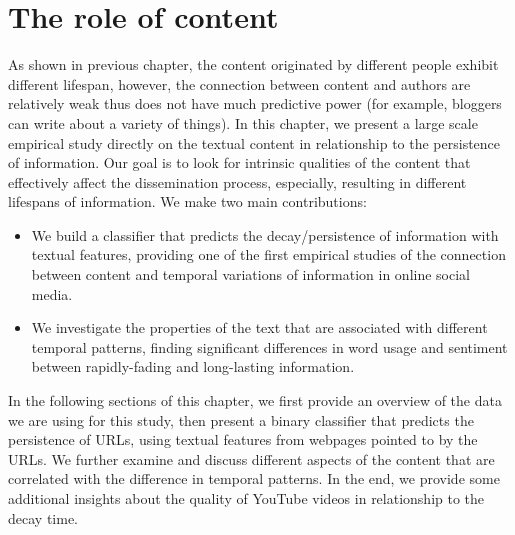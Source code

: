 \documentclass[phd,tocprelim]{cornell}
\begin{document}


\chapter{The role of content}
\label{chap:content}
As shown in previous chapter, the content originated by different people exhibit different lifespan, however, the connection between content and authors are relatively weak thus does not have much predictive power (for example, bloggers can write about a variety of things). In this chapter, we present a large scale empirical study directly on the textual content in relationship to the persistence of information. Our goal is to look for intrinsic qualities of the content that effectively affect the dissemination process, especially, resulting in different lifespans of information. We make two main contributions:
\begin{itemize}
\item We build a classifier that predicts the decay/persistence of information with textual features, providing one of the first empirical studies of the connection between content and temporal variations of information in online social media.
\item We investigate the properties of the text that are associated
with different temporal patterns, finding significant differences in
word usage and sentiment between rapidly-fading and long-lasting information.
\end{itemize}

In the following sections of this chapter, we first provide an overview of the data we are using for this study, then present a binary classifier that predicts the persistence of URLs, using textual features from webpages pointed to by the URLs. We further examine and discuss different aspects of the content that are correlated with the difference in temporal patterns. In the end, we provide some additional insights about the quality of YouTube videos in relationship to the decay time.
\end{document}
